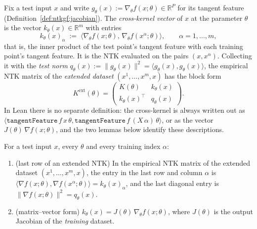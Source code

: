 \begin{definition}\label{def:ntkgf:crossKernel}
Fix a test input $x$ and write $g_\theta(x):=\nabla_\theta f(x;\theta)\in\mathbb R^P$ for its tangent feature (Definition~\ref{def:ntkgf:jacobian}). The \emph{cross-kernel vector} of $x$ at the parameter $\theta$ is the vector $k_\theta(x)\in\mathbb R^m$ with entries
\[
  k_\theta(x)_\alpha\;:=\;\bigl\langle\nabla_\theta f(x;\theta),\,\nabla_\theta f(x^\alpha;\theta)\bigr\rangle ,\qquad\alpha=1,\dots,m,
\]
that is, the inner product of the test point's tangent feature with each training point's tangent feature. It is the NTK evaluated on the pairs $(x,x^\alpha)$.
Collecting it with the \emph{test norm} $q_\theta(x):=\|g_\theta(x)\|^2=\langle g_\theta(x),g_\theta(x)\rangle$, the empirical NTK matrix of the \emph{extended dataset} $(x^1,\dots,x^m,x)$ has the block form
\[
  K^{\mathrm{ext}}(\theta)=\begin{pmatrix}K(\theta)&k_\theta(x)\\ k_\theta(x)^\top&q_\theta(x)\end{pmatrix}.
\]
In Lean there is no separate definition: the cross-kernel is always written out as $\langle\texttt{tangentFeature}\,f\,x\,\theta,\texttt{tangentFeature}\,f\,(X\,\alpha)\,\theta\rangle$, or as the vector $J(\theta)\,\nabla f(x;\theta)$, and the two lemmas below identify these descriptions.
\end{definition}

\begin{lemma}\label{lem:ntkgf:crossKernelFormulas}
  \leanok
For a test input $x$, every $\theta$ and every training index $\alpha$:
\begin{enumerate}
  \item (last row of an extended NTK) In the empirical NTK matrix of the extended dataset $(x^1,\dots,x^m,x)$, the entry in the last row and column $\alpha$ is $\langle\nabla f(x;\theta),\nabla f(x^\alpha;\theta)\rangle=k_\theta(x)_\alpha$, and the last diagonal entry is $\|\nabla f(x;\theta)\|^2=q_\theta(x)$.
  \item (matrix--vector form) $k_\theta(x)=J(\theta)\,\nabla_\theta f(x;\theta)$, where $J(\theta)$ is the output Jacobian of the \emph{training} dataset.
\end{enumerate}
\end{lemma}


